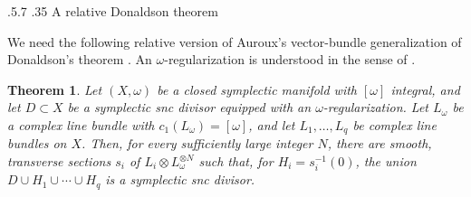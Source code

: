 \documentclass[11pt]{amsart}
\makeatletter
\numberwithin{equation}{section}
\renewcommand{\section}{%
  \@startsection{section}{1}%
    \z@
    {.5\linespacing\@plus.7\linespacing}%
    {.35\linespacing}%
    {\normalfont\bfseries}}
\theoremstyle{plain}
\newtheorem{theorem}{Theorem}[section]
\theoremstyle{definition}
\makeatother
\begin{document}

\section{A relative Donaldson theorem}
\label{SS: Donaldson theorem}

We need the following relative version of Auroux's vector-bundle
generalization of Donaldson's theorem \cite[Thm.\,2]{Auroux}. An
$\omega$-regularization is understood in the sense of
\cite[Def.\,2.12]{TMZ1}.

\begin{theorem}
\label{Thm: strong Bertini} Let $(X,\omega)$ be a closed symplectic manifold
with $[\omega]$ integral, and let $D\subset X$ be a symplectic snc divisor
equipped with an $\omega$-regularization. Let $L_\omega$ be a complex line
bundle with $c_1(L_\omega)=[\omega]$, and let $L_1,\ldots,L_q$ be complex line
bundles on $X$. Then, for every sufficiently large integer $N$, there are
smooth, transverse sections $s_i$ of $L_i\otimes L_\omega^{\otimes N}$ such
that, for $H_i=s_i^{-1}(0)$, the union $D\cup H_1\cup\cdots\cup H_q$ is a
symplectic snc divisor.
\end{theorem}
\end{document}
